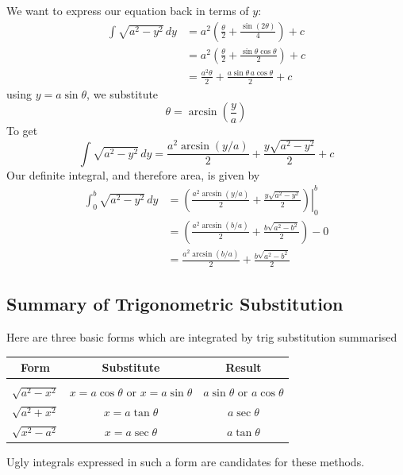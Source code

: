\documentclass{report}
\begin{document}
We want to express our equation back in terms of $y$:
\begin{align*}
\int\sqrt{a^2-y^2}\,dy&=a^2\left(\frac{\theta}{2}+\frac{\sin(2\theta)}{4}\right)+c\\
&=a^2\left(\frac{\theta}{2}+\frac{\sin\theta\cos\theta}{2}\right)+c\\
&=\frac{a^2\theta}{2}+\frac{a\sin\theta\,a\cos\theta}{2}+c
\end{align*}
using $y=a\sin\theta$, we substitute
\begin{equation*}
\theta=\arcsin\left(\frac{y}{a}\right)
\end{equation*}
To get
\begin{equation*}
\int\sqrt{a^2-y^2}\,dy=\frac{a^2\arcsin(y/a)}{2}+\frac{y\sqrt{a^2-y^2}}{2}+c
\end{equation*}
Our definite integral, and therefore area, is given by
\begin{align*}
\int_0^b\sqrt{a^2-y^2}\,dy
&=\left.\left(\frac{a^2\arcsin(y/a)}{2}+\frac{y\sqrt{a^2-y^2}}{2}\right)\right|^b_0\\
&=\left(\frac{a^2\arcsin(b/a)}{2}+\frac{b\sqrt{a^2-b^2}}{2}\right)-0\\
&=\frac{a^2\arcsin(b/a)}{2}+\frac{b\sqrt{a^2-b^2}}{2}
\end{align*}
\newpage

\subsection{Summary of Trigonometric Substitution} %
Here are three basic forms which are integrated by trig substitution summarised
\begin{center}
\begin{tabular}{c|c|c}
Form&Substitute&Result\\[0.5ex]
\hline
&&\\
$\sqrt{a^2-x^2}$&$x=a\cos\theta$ or $x=a\sin\theta$&$a\sin\theta$ or $a\cos\theta$\\[2ex]
$\sqrt{a^2+x^2}$&$x=a\tan\theta$&$a\sec\theta$\\[2ex]
$\sqrt{x^2-a^2}$&$x=a\sec\theta$&$a\tan\theta$
\end{tabular}
\end{center}
Ugly integrals expressed in such a form are candidates for these methods.
\end{document}
